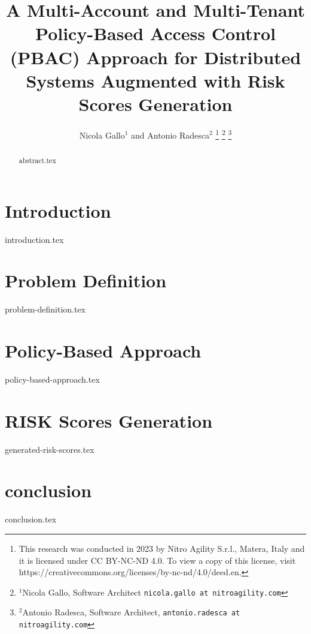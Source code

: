 \documentclass[letterpaper, 10 pt, conference]{ieeeconf}  %
\title{\LARGE \bf
A Multi-Account and Multi-Tenant Policy-Based Access Control (PBAC) Approach for Distributed Systems Augmented with Risk Scores Generation
}
\author{Nicola Gallo$^{1}$ and Antonio Radesca$^{2}$%
\thanks{This research was conducted in 2023 by Nitro Agility S.r.l., Matera, Italy and it is licensed under CC BY-NC-ND 4.0. To view a copy of this license, visit https://creativecommons.org/licenses/by-nc-nd/4.0/deed.en.}%
\thanks{$^{1}$Nicola Gallo, Software Architect
        {\tt\small nicola.gallo at nitroagility.com}}%
\thanks{$^{2}$Antonio Radesca, Software Architect,
        {\tt\small antonio.radesca at nitroagility.com}}%
}
\begin{document}
\maketitle
\thispagestyle{empty}
\pagestyle{empty}

\begin{abstract}
{abstract.tex}
\end{abstract}

\section{Introduction}
\label{sec:introduction}
{introduction.tex}

\section{Problem Definition}
\label{sec:problemdefinition}
{problem-definition.tex}

\newpage

\section{Policy-Based Approach}
\label{sec:permissioningapproach}
{policy-based-approach.tex}

\section{RISK Scores Generation}
\label{sec:generatedriskscores}
{generated-risk-scores.tex}

\section{conclusion}
\label{sec:conclusion}
{conclusion.tex}

\addtolength{\textheight}{-12cm}   %
\end{document}

